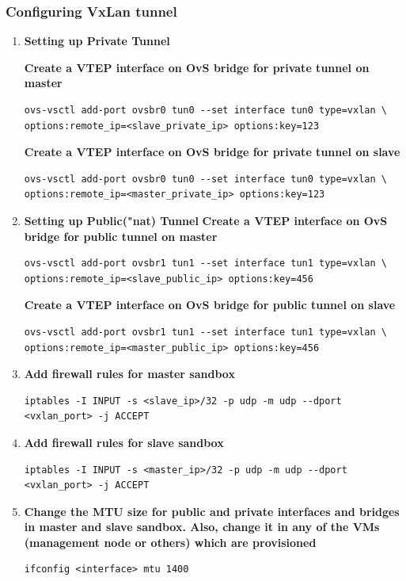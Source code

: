 \documentclass[12pt]{extarticle}
\begin{document}
\subsubsection{Configuring VxLan tunnel} \label{vxlan_config}

\begin{enumerate}


\item \textbf{Setting up Private Tunnel}
\noindent

\textbf{Create a VTEP interface on OvS bridge for private tunnel on master}
\begin{verbatim}
ovs-vsctl add-port ovsbr0 tun0 --set interface tun0 type=vxlan \
options:remote_ip=<slave_private_ip> options:key=123
\end{verbatim}

\noindent
\textbf{Create a VTEP interface on OvS bridge for private tunnel on slave}
\begin{verbatim}
ovs-vsctl add-port ovsbr0 tun0 --set interface tun0 type=vxlan \
options:remote_ip=<master_private_ip> options:key=123
\end{verbatim}


\item \textbf{Setting up Public("nat) Tunnel}
\textbf{Create a VTEP interface on OvS bridge for public tunnel on master}
\begin{verbatim}
ovs-vsctl add-port ovsbr1 tun1 --set interface tun1 type=vxlan \
options:remote_ip=<slave_public_ip> options:key=456
\end{verbatim}

\noindent
\textbf{Create a VTEP interface on OvS bridge for public tunnel on slave}
\begin{verbatim}
ovs-vsctl add-port ovsbr1 tun1 --set interface tun1 type=vxlan \
options:remote_ip=<master_public_ip> options:key=456
\end{verbatim}

\item \textbf{Add firewall rules for master sandbox}
\noindent
\begin{verbatim}
iptables -I INPUT -s <slave_ip>/32 -p udp -m udp --dport <vxlan_port> -j ACCEPT
\end{verbatim}

\item \textbf{Add firewall rules for slave sandbox}
\noindent
\begin{verbatim}
iptables -I INPUT -s <master_ip>/32 -p udp -m udp --dport <vxlan_port> -j ACCEPT
\end{verbatim}

\item \textbf{Change the MTU size for public and private interfaces and bridges in master and slave sandbox. Also, change it in any of the VMs (management node or others) which are provisioned}
\begin{verbatim}
ifconfig <interface> mtu 1400
\end{verbatim}

\end{enumerate}
\end{document}
